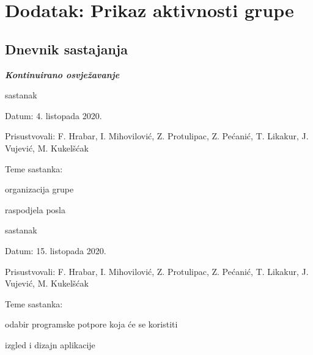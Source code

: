 \chapter*{Dodatak: Prikaz aktivnosti grupe}
		
		\section*{Dnevnik sastajanja}
		
		\textbf{\textit{Kontinuirano osvježavanje}}\\
		
	
		
		\begin{packed_enum}
			\item  sastanak
			
			\item[] \begin{packed_item}
				\item Datum: 4. listopada 2020.
				\item Prisustvovali: F. Hrabar, I. Mihovilović, Z. Protulipac, Z. Pećanić, T. Likakur, J. Vujević, M. Kukelšćak
				\item Teme sastanka:
				\begin{packed_item}
					\item  organizacija grupe
					\item  raspodjela posla
				\end{packed_item}
			\end{packed_item}
			
			\item  sastanak
			\item[] \begin{packed_item}
				\item Datum: 15. listopada 2020.
				\item Prisustvovali: F. Hrabar, I. Mihovilović, Z. Protulipac, Z. Pećanić, T. Likakur, J. Vujević, M. Kukelšćak
				\item Teme sastanka:
				\begin{packed_item}
					\item  odabir programske potpore koja će se koristiti
					\item  izgled i dizajn aplikacije
				\end{packed_item}
			\end{packed_item}
			

\end{packed_enum}
